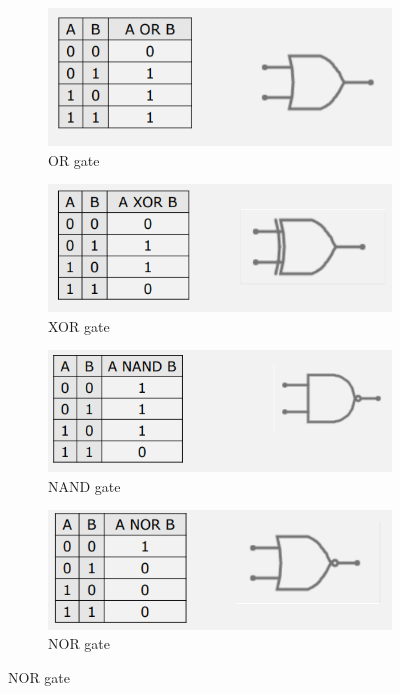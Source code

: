 \documentclass{article}
\begin{document}
\begin{figure}[h!]
    \centering
    \begin{subfigure}{.4\textwidth}
        \centering
        \includegraphics[width=\linewidth]{IM_OR.PNG}
        \caption{OR gate}
        \label{OR}
    \end{subfigure}
    \hfill
    \begin{subfigure}{.4\textwidth}
        \centering
        \includegraphics[width=\linewidth]{IM_XOR.PNG}
        \caption{XOR gate}
        \label{XOR}        
    \end{subfigure}
    
    \centering
    \begin{subfigure}{.4\textwidth}
        \centering
        \includegraphics[width=\linewidth]{IM_NAND.PNG}
        \caption{NAND gate}
        \label{NAND}
    \end{subfigure}
    \hfill
    \begin{subfigure}{.4\textwidth}
        \centering
        \includegraphics[width=\linewidth]{IM_NOR.PNG}
        \caption{NOR gate}
        \label{NOR}        
    \end{subfigure}
    

\end{figure}
\end{document}
